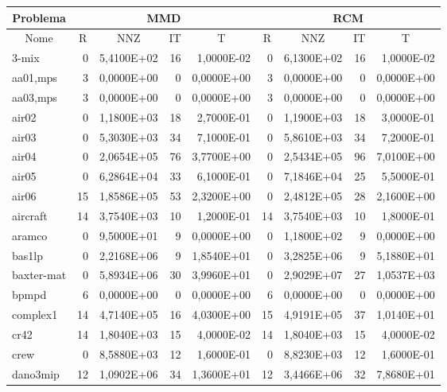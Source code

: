\begin{tabular}{|l|r|r|r|r|r|r|r|r|}
\hline
\multicolumn{1}{|c|}{Problema} & \multicolumn{4}{|c|}{MMD} &         \multicolumn{4}{|c|}{RCM} \\ \hline
\multicolumn{1}{|c|}{Nome} & \multicolumn{1}{|c|}{R} &
        \multicolumn{1}{|c|}{NNZ} & \multicolumn{1}{|c|}{IT} &
        \multicolumn{1}{|c|}{T} & \multicolumn{1}{|c|}{R} &
        \multicolumn{1}{|c|}{NNZ} & \multicolumn{1}{|c|}{IT} &
        \multicolumn{1}{|c|}{T} \\ \hline
3-mix & 0 & 5,4100E+02 & 16 & 1,0000E-02 & 0 & 6,1300E+02 & 16 & 1,0000E-02 \\ \hline
aa01,mps & 3 & 0,0000E+00 & 0 & 0,0000E+00 & 3 & 0,0000E+00 & 0 & 0,0000E+00 \\ \hline
aa03,mps & 3 & 0,0000E+00 & 0 & 0,0000E+00 & 3 & 0,0000E+00 & 0 & 0,0000E+00 \\ \hline
air02 & 0 & 1,1800E+03 & 18 & 2,7000E-01 & 0 & 1,1900E+03 & 18 & 3,0000E-01 \\ \hline
air03 & 0 & 5,3030E+03 & 34 & 7,1000E-01 & 0 & 5,8610E+03 & 34 & 7,2000E-01 \\ \hline
air04 & 0 & 2,0654E+05 & 76 & 3,7700E+00 & 0 & 2,5434E+05 & 96 & 7,0100E+00 \\ \hline
air05 & 0 & 6,2864E+04 & 33 & 6,1000E-01 & 0 & 7,1846E+04 & 25 & 5,5000E-01 \\ \hline
air06 & 15 & 1,8586E+05 & 53 & 2,3200E+00 & 0 & 2,4812E+05 & 28 & 2,1600E+00 \\ \hline
aircraft & 14 & 3,7540E+03 & 10 & 1,2000E-01 & 14 & 3,7540E+03 & 10 & 1,8000E-01 \\ \hline
aramco & 0 & 9,5000E+01 & 9 & 0,0000E+00 & 0 & 1,1800E+02 & 9 & 0,0000E+00 \\ \hline
bas1lp & 0 & 2,2168E+06 & 9 & 1,8540E+01 & 0 & 3,2825E+06 & 9 & 5,1880E+01 \\ \hline
baxter-mat & 0 & 5,8934E+06 & 30 & 3,9960E+01 & 0 & 2,9029E+07 & 27 & 1,0537E+03 \\ \hline
bpmpd & 6 & 0,0000E+00 & 0 & 0,0000E+00 & 6 & 0,0000E+00 & 0 & 0,0000E+00 \\ \hline
complex1 & 14 & 4,7140E+05 & 16 & 4,0300E+00 & 15 & 4,9191E+05 & 37 & 1,0140E+01 \\ \hline
cr42 & 14 & 1,8040E+03 & 15 & 4,0000E-02 & 14 & 1,8040E+03 & 15 & 4,0000E-02 \\ \hline
crew & 0 & 8,5880E+03 & 12 & 1,6000E-01 & 0 & 8,8230E+03 & 12 & 1,6000E-01 \\ \hline
dano3mip & 12 & 1,0902E+06 & 34 & 1,3600E+01 & 12 & 3,4466E+06 & 32 & 7,8680E+01 \\ \hline

\end{tabular}
